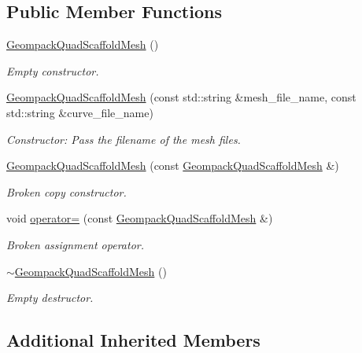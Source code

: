 \subsection*{Public Member Functions}
\begin{DoxyCompactItemize}
\item 
\hyperlink{classoomph_1_1GeompackQuadScaffoldMesh_a1bb5b51d0f1ebf5bd22e26d348759764}{Geompack\+Quad\+Scaffold\+Mesh} ()
\begin{DoxyCompactList}\small\item\em Empty constructor. \end{DoxyCompactList}\item 
\hyperlink{classoomph_1_1GeompackQuadScaffoldMesh_acc11df848033ff3397c8062ab73f4bbc}{Geompack\+Quad\+Scaffold\+Mesh} (const std\+::string \&mesh\+\_\+file\+\_\+name, const std\+::string \&curve\+\_\+file\+\_\+name)
\begin{DoxyCompactList}\small\item\em Constructor\+: Pass the filename of the mesh files. \end{DoxyCompactList}\item 
\hyperlink{classoomph_1_1GeompackQuadScaffoldMesh_a409945b2211b91a8f98157a84671368e}{Geompack\+Quad\+Scaffold\+Mesh} (const \hyperlink{classoomph_1_1GeompackQuadScaffoldMesh}{Geompack\+Quad\+Scaffold\+Mesh} \&)
\begin{DoxyCompactList}\small\item\em Broken copy constructor. \end{DoxyCompactList}\item 
void \hyperlink{classoomph_1_1GeompackQuadScaffoldMesh_a04b758450e0209b6c908d17b4fa13939}{operator=} (const \hyperlink{classoomph_1_1GeompackQuadScaffoldMesh}{Geompack\+Quad\+Scaffold\+Mesh} \&)
\begin{DoxyCompactList}\small\item\em Broken assignment operator. \end{DoxyCompactList}\item 
\hyperlink{classoomph_1_1GeompackQuadScaffoldMesh_a6fd83d6d176dd54c218537d1dc61bd1d}{$\sim$\+Geompack\+Quad\+Scaffold\+Mesh} ()
\begin{DoxyCompactList}\small\item\em Empty destructor. \end{DoxyCompactList}\end{DoxyCompactItemize}
\subsection*{Additional Inherited Members}


